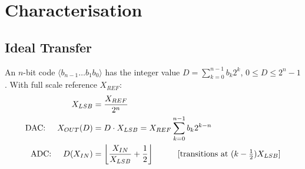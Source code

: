 \section{Characterisation}\label{sec:dc_char}

\subsection{Ideal Transfer}
An \(n\)-bit code \(\langle b_{n-1} \ldots b_1 b_0 \rangle\) has the integer value
\(D = \sum_{k=0}^{n-1} b_k 2^k\), \(0 \leq D \leq 2^n - 1\). With full scale
reference \(X_{REF}\):
\begin{align*}
  X_{LSB} &= \frac{X_{REF}}{2^n} \\
  \text{DAC:} \hspace{0.5cm} X_{OUT}(D) &= D \cdot X_{LSB} = X_{REF} \sum_{k=0}^{n-1} b_k 2^{k-n} \\
  \text{ADC:} \hspace{0.5cm} D(X_{IN}) &= \left\lfloor \frac{X_{IN}}{X_{LSB}} + \frac{1}{2} \right\rfloor \hspace{1cm} [\text{transitions at } (k - \tfrac{1}{2}) X_{LSB}]
\end{align*}

